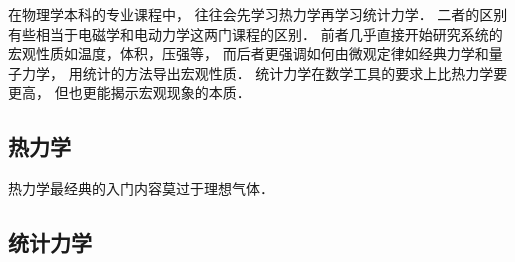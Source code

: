 
在物理学本科的专业课程中， 往往会先学习热力学再学习统计力学． 二者的区别有些相当于电磁学和电动力学这两门课程的区别． 前者几乎直接开始研究系统的宏观性质如温度，体积，压强等， 而后者更强调如何由微观定律如经典力学和量子力学， 用统计的方法导出宏观性质． 统计力学在数学工具的要求上比热力学要更高， 但也更能揭示宏观现象的本质．

\subsection{热力学}
热力学最经典的入门内容莫过于理想气体．

\subsection{统计力学}
